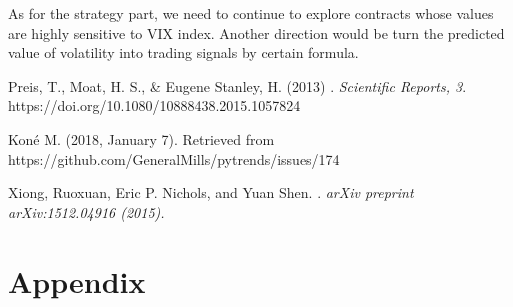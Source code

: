 \documentclass[11pt]{article}
\begin{document}
\vspace{5mm}

As for the strategy part, we need to continue to explore contracts whose values are highly sensitive to VIX index. Another direction would be turn the predicted value of volatility into trading signals by certain formula.

\begin{thebibliography}{10}

Preis, T., Moat, H. S., \& Eugene Stanley, H. (2013)
.
\newblock \emph{Scientific Reports, 3}. https://doi.org/10.1080/10888438.2015.1057824

Koné M. (2018, January 7).
\newblock Retrieved from https://github.com/GeneralMills/pytrends/issues/174

Xiong, Ruoxuan, Eric P. Nichols, and Yuan Shen. 
. 
\newblock \emph{arXiv preprint arXiv:1512.04916 (2015).}


\end{thebibliography}

\newpage
\appendix
\section{Appendix}
\end{document}
